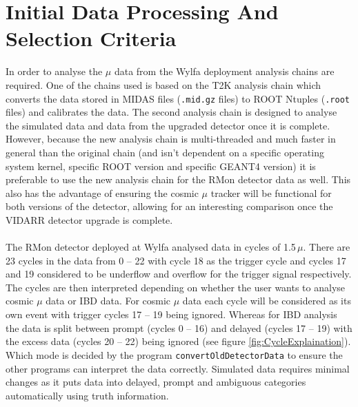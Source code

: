 \section{Initial Data Processing And Selection Criteria}\label{sec:muonAnalysisChain}
In order to analyse the $\mu$ data from the Wylfa deployment analysis chains are required. One of the chains used is based on the T2K analysis chain which converts the data stored in MIDAS \cite{ritt1997midas} files (\texttt{.mid.gz} files) to ROOT Ntuples (\texttt{.root} files) and calibrates the data. The second analysis chain is designed to analyse the simulated data and data from the upgraded detector once it is complete. However, because the new analysis chain is multi-threaded and much faster in general than the original chain (and isn't dependent on a specific operating system kernel, specific ROOT version and specific GEANT4 version) it is preferable to use the new analysis chain for the RMon detector data as well. This also has the advantage of ensuring the cosmic $\mu$ tracker will be functional for both versions of the detector, allowing for an interesting comparison once the VIDARR detector upgrade is complete. 
\\\\The RMon detector deployed at Wylfa analysed data in cycles of 1.5\,$\mu$. There are 23 cycles in the data from 0 -- 22 with cycle 18 as the trigger cycle and cycles 17 and 19 considered to be underflow and overflow for the trigger signal respectively. The cycles are then interpreted depending on whether the user wants to analyse cosmic $\mu$ data or IBD data. For cosmic $\mu$ data each cycle will be considered as its own event with trigger cycles 17 -- 19 being ignored. Whereas for IBD analysis the data is split between prompt (cycles 0 -- 16) and delayed (cycles 17 -- 19) with the excess data (cycles 20 -- 22) being ignored (see figure \ref{fig:CycleExplaination}). Which mode is decided by the program \texttt{convertOldDetectorData} to ensure the other programs can interpret the data correctly. Simulated data requires minimal changes as it puts data into delayed, prompt and ambiguous categories automatically using truth information.

